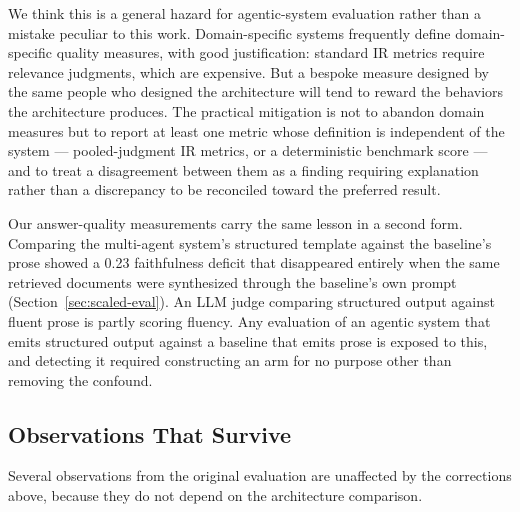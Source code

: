 We think this is a general hazard for agentic-system evaluation rather than a
mistake peculiar to this work. Domain-specific systems frequently define
domain-specific quality measures, with good justification: standard IR metrics
require relevance judgments, which are expensive. But a bespoke measure designed
by the same people who designed the architecture will tend to reward the
behaviors the architecture produces. The practical mitigation is not to abandon
domain measures but to report at least one metric whose definition is
independent of the system --- pooled-judgment IR metrics, or a deterministic
benchmark score --- and to treat a disagreement between them as a finding
requiring explanation rather than a discrepancy to be reconciled toward the
preferred result.

Our answer-quality measurements carry the same lesson in a second form.
Comparing the multi-agent system's structured template against the baseline's
prose showed a 0.23 faithfulness deficit that disappeared entirely when the same
retrieved documents were synthesized through the baseline's own prompt
(Section~\ref{sec:scaled-eval}). An LLM judge comparing structured output
against fluent prose is partly scoring fluency. Any evaluation of an agentic
system that emits structured output against a baseline that emits prose is
exposed to this, and detecting it required constructing an arm for no purpose
other than removing the confound.

\subsection{Observations That Survive}\label{sec:survives}

Several observations from the original evaluation are unaffected by the
corrections above, because they do not depend on the architecture comparison.

